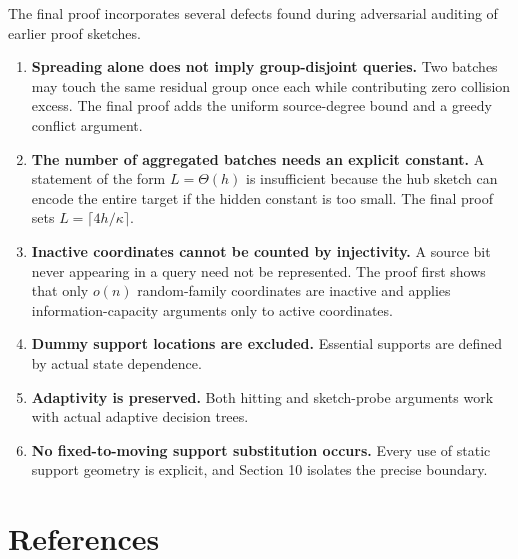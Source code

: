 \documentclass[
]{article}
\providecommand{\tightlist}{%
  \setlength{\itemsep}{0pt}\setlength{\parskip}{0pt}}
\begin{document}
The final proof incorporates several defects found during adversarial
auditing of earlier proof sketches.

\begin{enumerate}
\def\labelenumi{\arabic{enumi}.}
\tightlist
\item
  \textbf{Spreading alone does not imply group-disjoint queries.} Two
  batches may touch the same residual group once each while contributing
  zero collision excess. The final proof adds the uniform source-degree
  bound and a greedy conflict argument.
\item
  \textbf{The number of aggregated batches needs an explicit constant.}
  A statement of the form \(L=\Theta(h)\) is insufficient because the
  hub sketch can encode the entire target if the hidden constant is too
  small. The final proof sets \(L=\lceil4h/\kappa\rceil\).
\item
  \textbf{Inactive coordinates cannot be counted by injectivity.} A
  source bit never appearing in a query need not be represented. The
  proof first shows that only \(o(n)\) random-family coordinates are
  inactive and applies information-capacity arguments only to active
  coordinates.
\item
  \textbf{Dummy support locations are excluded.} Essential supports are
  defined by actual state dependence.
\item
  \textbf{Adaptivity is preserved.} Both hitting and sketch-probe
  arguments work with actual adaptive decision trees.
\item
  \textbf{No fixed-to-moving support substitution occurs.} Every use of
  static support geometry is explicit, and Section 10 isolates the
  precise boundary.
\end{enumerate}

\hypertarget{references}{%
\section*{References}\label{references}}
\end{document}
